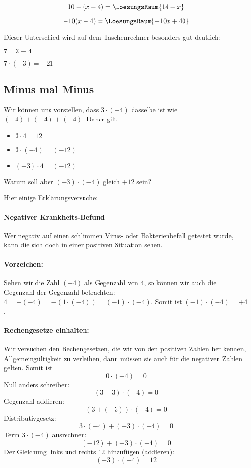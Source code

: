 $$10-(x-4) =\LoesungsRaum{14-x}$$

$$-10(x-4) = \LoesungsRaum{-10x + 40}$$

Dieser Unterschied wird auf dem Taschenrechner besonders gut deutlich:

    $ 7 - 3 = 4$

\vspace{3mm}
   $ 7\cdot{}(-3) = -21$

\newpage
\subsection{Minus mal Minus}
Wir können uns vorstellen, dass $3 \cdot (-4)$ dasselbe ist wie $(-4) + (-4) + (-4)$. Daher gilt
\begin{itemize}
\item $3 \cdot 4 = 12$
\item $3 \cdot (-4) = (-12)$
\item $(-3) \cdot 4 = (-12)$
\end{itemize}
Warum soll aber $(-3)\cdot(-4)$ gleich $+12$ sein?

Hier einige Erklärungsversuche:


\paragraph{Negativer Krankheits-Befund}
Wer negativ auf einen schlimmen Virus- oder Bakterienbefall getestet wurde, kann
die sich doch in einer positiven Situation sehen.

\paragraph{Vorzeichen:} Sehen wir die Zahl $(-4)$ als Gegenzahl von $4$, so können wir auch die Gegenzahl der Gegenzahl betrachten:
$4 = -(-4) = -(1\cdot(-4)) = (-1)\cdot(-4)$. Somit ist $(-1)\cdot(-4) = +4$.

\paragraph{Rechengesetze einhalten:} Wir versuchen den Rechengesetzen, die wir von den positiven Zahlen her kennen, Allgemeingültigkeit zu verleihen, dann müssen sie auch für die negativen Zahlen gelten.
Somit ist
$$0          \cdot (-4) = 0$$
Null anders schreiben:
$$(3 - 3)    \cdot (-4) = 0$$
Gegenzahl addieren:
$$(3 + (-3)) \cdot (-4) = 0$$
Distributivgesetz:
$$3\cdot (-4) + (-3)\cdot (-4) = 0$$
Term $3\cdot(-4)$ ausrechnen:
$$(-12) + (-3)\cdot (-4) = 0$$
Der Gleichung links und rechts 12 hinzufügen (addieren):
$$(-3)\cdot (-4) = 12$$

